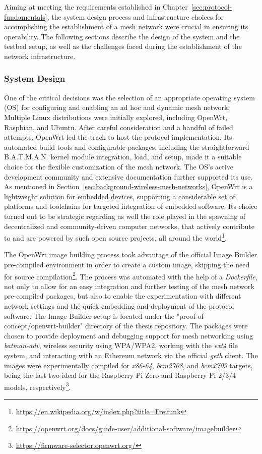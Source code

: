 Aiming at meeting the requirements established in Chapter~\ref{sec:protocol-fundamentals}, the system design process and infrastructure choices for accomplishing the establishment of a mesh network were crucial in ensuring its operability. The following sections describe the design of the system and the testbed setup, as well as the challenges faced during the establishment of the network infrastructure.

\subsubsection{System Design} \label{sec:infrastructure}

One of the critical decisions was the selection of an appropriate operating system (OS) for configuring and enabling an ad hoc and dynamic mesh network. Multiple Linux distributions were initially explored, including OpenWrt, Raspbian, and Ubuntu. After careful consideration and a handful of failed attempts, OpenWrt led the track to host the protocol implementation. Its automated build tools and configurable packages, including the straightforward B.A.T.M.A.N. kernel module integration, load, and setup, made it a suitable choice for the flexible customization of the mesh network. The OS's active development community and extensive documentation further supported its use. As mentioned in Section~\ref{sec:background-wireless-mesh-networks}, OpenWrt is a lightweight solution for embedded devices, supporting a considerable set of platforms and toolchains for targeted integration of embedded software. Its choice turned out to be strategic regarding as well the role played in the spawning of decentralized and community-driven computer networks, that actively contribute to and are powered by such open source projects, all around the world\footnote{\url{https://en.wikipedia.org/w/index.php?title=Freifunk}}.

The OpenWrt image building process took advantage of the official Image Builder pre-compiled environment in order to create a custom image, skipping the need for source compilation\footnote{\url{https://openwrt.org/docs/guide-user/additional-software/imagebuilder}}. The process was automated with the help of a \emph{Dockerfile}, not only to allow for an easy integration and further testing of the mesh network pre-compiled packages, but also to enable the experimentation with different network settings and the quick embedding and deployment of the \pol{} protocol software. The Image Builder setup is located under the "proof-of-concept/openwrt-builder" directory of the thesis repository. The packages were chosen to provide deployment and debugging support for mesh networking using \emph{batman-adv}, wireless security using WPA/WPA2, working with the \emph{ext4} file system, and interacting with an Ethereum network via the official \emph{geth} client. The images were experimentally compiled for \emph{x86-64}, \emph{bcm2708}, and \emph{bcm2709} targets, being the last two ideal for the Raspberry Pi Zero and Raspberry Pi 2/3/4 models, respectively\footnote{\url{https://firmware-selector.openwrt.org/}}.

